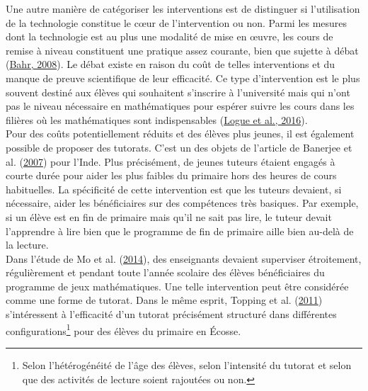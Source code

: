 \documentclass[
]{book}
\begin{document}
\quad Une autre manière de catégoriser les interventions est de distinguer si l'utilisation de la technologie constitue le cœur de l'intervention ou non. Parmi les mesures dont la technologie est au plus une modalité de mise en œuvre, les cours de remise à niveau constituent une pratique assez courante, bien que sujette à débat (\protect\hyperlink{ref-BAH:08}{Bahr, 2008}). Le débat existe en raison du coût de telles interventions et du manque de preuve scientifique de leur efficacité. Ce type d'intervention est le plus souvent destiné aux élèves qui souhaitent s'inscrire à l'université mais qui n'ont pas le niveau nécessaire en mathématiques pour espérer suivre les cours dans les filières où les mathématiques sont indispensables (\protect\hyperlink{ref-LOG:eal:16}{Logue et al., 2016}).\\
Pour des coûts potentiellement réduits et des élèves plus jeunes, il est également possible de proposer des tutorats. C'est un des objets de l'article de Banerjee et al. (\protect\hyperlink{ref-BAN:eal:07}{2007}) pour l'Inde. Plus précisément, de jeunes tuteurs étaient engagés à courte durée pour aider les plus faibles du primaire hors des heures de cours habituelles. La spécificité de cette intervention est que les tuteurs devaient, si nécessaire, aider les bénéficiaires sur des compétences très basiques. Par exemple, si un élève est en fin de primaire mais qu'il ne sait pas lire, le tuteur devait l'apprendre à lire bien que le programme de fin de primaire aille bien au-delà de la lecture.\\
Dans l'étude de Mo et al. (\protect\hyperlink{ref-MO:eal:14}{2014}), des enseignants devaient superviser étroitement, régulièrement et pendant toute l'année scolaire des élèves bénéficiaires du programme de jeux mathématiques. Une telle intervention peut être considérée comme une forme de tutorat. Dans le même esprit, Topping et al. (\protect\hyperlink{ref-TOP:eal:11}{2011}) s'intéressent à l'efficacité d'un tutorat précisément structuré dans différentes configurations\footnote{Selon l'hétérogénéité de l'âge des élèves, selon l'intensité du tutorat et selon que des activités de lecture soient rajoutées ou non.} pour des élèves du primaire en Écosse.
\end{document}
